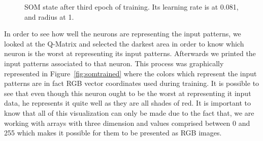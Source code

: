 \begin{figure}[h!]
  \centering
  \hspace*{0.5cm}
  \hspace*{0.5cm}
  \hspace*{0.5cm}
  \caption{ SOM state after third epoch of training. Its learning rate is at 0.081, and radius at 1.  }
  \label{fig:}
\end{figure}

In order to see how well the neurons are representing the input patterns, we looked at the \ac{Q-Matrix} and selected the darkest area in order to know which neuron is the worst at representing its input patterns. Afterwards we printed the input patterns associated to that neuron. This process was graphically represented in Figure~\ref{fig:somtrained} where the colors which represent the input patterns are in fact RGB vector coordinates used during training. It is possible to see that even though this neuron ought to be the worst at representing it input data, he represents it quite well as they are all shades of red. 
It is important to know that all of this visualization can only be made due to the fact that, we are working with arrays with three dimension and values comprised between 0 and 255 which makes it possible for them to be presented as RGB images. 

